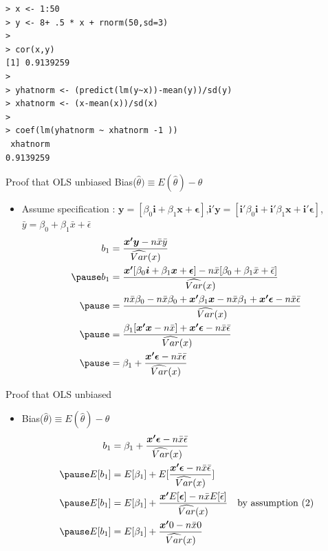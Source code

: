 \documentclass[aspectratio=169, handout]{beamer}
\numberwithin{equation}{section}
\begin{document}
\begin{frame}[fragile]
  \begin{lstlisting}
> x <- 1:50
> y <- 8+ .5 * x + rnorm(50,sd=3)
> 
> cor(x,y)
[1] 0.9139259
> 
> yhatnorm <- (predict(lm(y~x))-mean(y))/sd(y)
> xhatnorm <- (x-mean(x))/sd(x)
> 
> coef(lm(yhatnorm ~ xhatnorm -1 ))
 xhatnorm 
0.9139259 
   \end{lstlisting}
\end{frame}


\begin{frame}{Proof that OLS unbiased Bias($\hat{\theta})\equiv E(\hat{\theta})-\theta$}
\begin{itemize}
\item Assume specification : $\bm{y}=[\beta_0\bm{i}+\beta_1\bm{x}+\bm{\epsilon}]$,\quad $\bm{i'}\bm{y}=[\bm{i'}\beta_0\bm{i}+\bm{i'}\beta_1\bm{x}+\bm{i'}\bm{\epsilon}]$,\quad  $\bar{y}=\beta_0+\beta_1\bar{x}+\bar{\epsilon}$\pause
\begin{align*}
b_1&=\frac{\bm{x'y}-n\bar{x}\bar{y}}{\widehat{Var}(x)}\\\pause
b_1&=\frac{\bm{x'}[\beta_0\bm{i}+\beta_1\bm{x}+\bm{\epsilon}]-n\bar{x}[\beta_0+\beta_1\bar{x}+\bar{\epsilon}]}{\widehat{Var}(x)}\\\pause
&=\frac{n\bar{x}\beta_0-n\bar{x}\beta_0+\bm{x'}\beta_1\bm{x}-n\bar{x}\beta_1+\bm{x'}\bm{\epsilon}-n\bar{x}\bar{\epsilon}}{\widehat{Var}(x)}\\\pause
&=\frac{\beta_1[\bm{x'}\bm{x}-n\bar{x}]+\bm{x'}\bm{\epsilon}-n\bar{x}\bar{\epsilon}}{\widehat{Var}(x)}\\\pause
&=\beta_1+\frac{\bm{x'}\bm{\epsilon}-n\bar{x}\bar{\epsilon}}{\widehat{Var}(x)}
\end{align*}
\end{itemize}
\end{frame}


\begin{frame}{Proof that OLS unbiased}
\begin{itemize}
\item Bias($\hat{\theta})\equiv E(\hat{\theta})-\theta$\pause
\begin{align*}
b_1&=\beta_1+\frac{\bm{x'}\bm{\epsilon}-n\bar{x}\bar{\epsilon}}{\widehat{Var}(x)}\\\pause
E[b_1]&=E[\beta_1]+E[\frac{\bm{x'}\bm{\epsilon}-n\bar{x}\bar{\epsilon}}{\widehat{Var}(x)}]\\\pause
E[b_1]&=E[\beta_1]+\frac{ \bm{ x' }E[\bm{\epsilon}]-n\bar{x}E[ \bar{ \epsilon }] }{ \widehat{Var}(x) } \quad \text{by assumption (2)}\\\pause
E[b_1]&=E[\beta_1]+\frac{\bm{x'}0-n\bar{x}0}{\widehat{Var}(x)}
\end{align*}
\end{itemize}
\end{frame}
\end{document}
